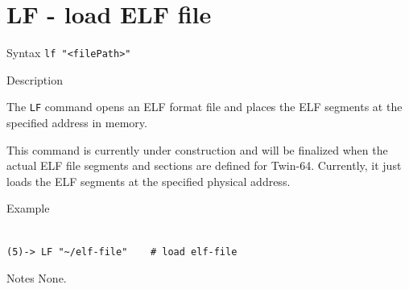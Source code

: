 %
%
\pagebreak
\section*{LF - load ELF file}

\begin{iPageDescEntry}{Syntax}
\texttt{lf "<filePath>" } \\
\end{iPageDescEntry}

\begin{iPageDescEntry}{Description}

The \texttt{LF} command opens an ELF format file and places the ELF segments at the specified address in memory. 

This command is currently under construction and will be finalized when the actual ELF file segments and sections are defined for Twin-64. Currently, it just loads the ELF segments at the specified physical address.

\end{iPageDescEntry}

\begin{iPageDescOpEntry}{Example}
\begin{lstlisting}[style=iPageOpStyle]

(5)-> LF "~/elf-file"    # load elf-file

\end{lstlisting}
\end{iPageDescOpEntry}

\begin{iPageDescEntry}{Notes}
None.
\end{iPageDescEntry}
